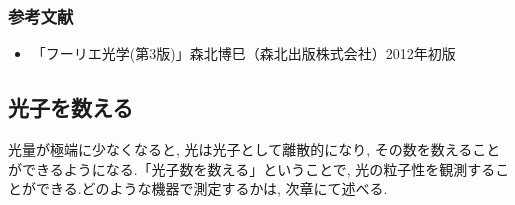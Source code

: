 \subsubsection{参考文献}
\begin{itemize}
  \item 「フーリエ光学(第3版)」森北博巳（森北出版株式会社）2012年初版
\end{itemize}
\clearpage


\subsection{光子を数える}
光量が極端に少なくなると, 光は光子として離散的になり, その数を数えることができるようになる.「光子数を数える」ということで, 光の粒子性を観測することができる.どのような機器で測定するかは, 次章にて述べる.
